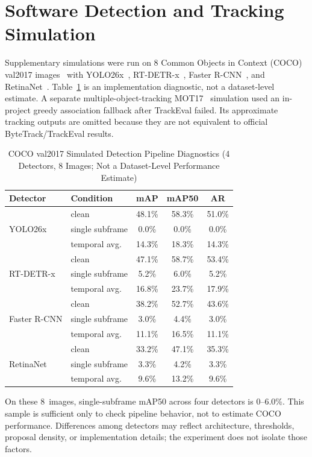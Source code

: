 \documentclass{ieeeaccess}
\begin{document}
\section{Software Detection and Tracking Simulation}
\label{sec:supp_sim_detection}

Supplementary simulations were run on 8 Common Objects in Context (COCO) val2017 images~\cite{b_coco2014} with YOLO26x~\cite{b_yolo26}, RT-DETR-x~\cite{b_rtdetr2024}, Faster R-CNN~\cite{b_fasterrcnn2015}, and RetinaNet~\cite{b_retinanet2017}. Table~\ref{tab:supp_coco_sim} is an implementation diagnostic, not a dataset-level estimate. A separate multiple-object-tracking MOT17~\cite{b_mot16} simulation used an in-project greedy association fallback after TrackEval failed. Its approximate tracking outputs are omitted because they are not equivalent to official ByteTrack/TrackEval results.

\begin{table}[!t]
\caption{COCO val2017 Simulated Detection Pipeline Diagnostics (4 Detectors, 8 Images; Not a Dataset-Level Performance Estimate)}
\label{tab:supp_coco_sim}
\centering
\footnotesize
\setlength{\tabcolsep}{5.8pt}
\begin{tabular}{llccc}
\toprule
Detector & Condition & mAP & mAP50 & AR \\
\midrule
\multirow{3}{*}{YOLO26x}
 & clean & 48.1\% & 58.3\% & 51.0\% \\
 & single subframe & 0.0\% & 0.0\% & 0.0\% \\
 & temporal avg. & 14.3\% & 18.3\% & 14.3\% \\
\midrule
\multirow{3}{*}{RT-DETR-x}
 & clean & 47.1\% & 58.7\% & 53.4\% \\
 & single subframe & 5.2\% & 6.0\% & 5.2\% \\
 & temporal avg. & 16.8\% & 23.7\% & 17.9\% \\
\midrule
\multirow{3}{*}{Faster R-CNN}
 & clean & 38.2\% & 52.7\% & 43.6\% \\
 & single subframe & 3.0\% & 4.4\% & 3.0\% \\
 & temporal avg. & 11.1\% & 16.5\% & 11.1\% \\
\midrule
\multirow{3}{*}{RetinaNet}
 & clean & 33.2\% & 47.1\% & 35.3\% \\
 & single subframe & 3.3\% & 4.2\% & 3.3\% \\
 & temporal avg. & 9.6\% & 13.2\% & 9.6\% \\
\bottomrule
\end{tabular}
\end{table}

On these 8~images, single-subframe mAP50 across four detectors is 0--6.0\%. This sample is sufficient only to check pipeline behavior, not to estimate COCO performance. Differences among detectors may reflect architecture, thresholds, proposal density, or implementation details; the experiment does not isolate those factors.



\EOD
\end{document}
